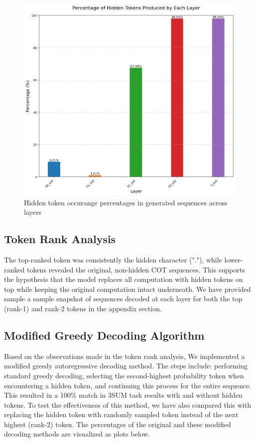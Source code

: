 \documentclass[10pt,a4paper]{article}
\begin{document}
\begin{figure}[h]
\centering
\includegraphics[width=\textwidth]{hidden_tokens_percentage_by_layer.png}
\caption{Hidden token occurange percentages in generated sequences across layers}
\label{fig:hidden_token_percentages}
\end{figure}

\subsection{Token Rank Analysis}
The top-ranked token was consistently the hidden character ("."), while lower-ranked tokens revealed the original, non-hidden COT sequences. This supports the hypothesis that the model replaces all computation with hidden tokens on top while keeping the original computation intact underneath. We have provided sample a sample snapshot of sequences decoded at each layer for both the top (rank-1) and rank-2 tokens in the appendix section.

\subsection{Modified Greedy Decoding Algorithm}
Based on the observations made in the token rank analysis, We implemented a modified greedy autoregressive decoding method. The steps include: performing standard greedy decoding, selecting the second-highest probability token when encountering a hidden token, and continuing this process for the entire sequence. This resulted in a 100\% match in 3SUM task results with and without hidden tokens. To test the effectiveness of this method, we have also compared this with replacing the hidden token with randomly sampled token instead of the next highest (rank-2) token. The percentages of the original and these modified decoding methods are visualized as plots below. 
\end{document}
